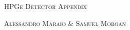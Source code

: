 \documentclass[11pt,a4paper]{article}
\begin{document}
\begin{center}

	{\scshape\Huge HPGe Detector Appendix \par} %
	\vspace{0.075cm}
	{\scshape\huge Alessandro Maraio \& Samuel Morgan \par}
\end{center}
\end{document}
